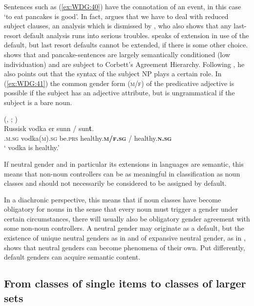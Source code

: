 \documentclass[output=collectionpaper]{langsci/langscibook}
\begin{document}
Sentences such as (\ref{ex:WDG:40}) have the connotation of an event, in this case `to eat pancakes is good'. In fact, \cite{Faarlund1977} argues that we have to deal with reduced subject clauses, an analysis which is dismissed by \cite{Enger2004}, who also shows that any last-resort default analysis runs into serious troubles. \cite[150]{Corbett2006} speaks of extension in use of the default, but last resort defaults cannot be extended, if there is some other choice. \cite{Enger2004} shows that  and  pancake-sentences are largely semantically conditioned (low individuation) and are subject to Corbett's Agreement Hierarchy. Following \cite{Widmark1966}, he also points out that the syntax of the subject NP plays a certain role. In (\ref{ex:WDG:41}) the common gender form (\textsc{m/f}) of the predicative adjective is possible if the subject has an adjective attribute, but is ungrammatical if the subject is a bare noun.

\ea\label{ex:WDG:41}
 (, ; \citealt[24]{Enger2004})\\
\gll	Russisk	vodka	er	sunn	/	sun\textbf{t}.\\
	.\textsc{m.sg}	vodka(\textsc{m).sg}	be.\textsc{prs}	healthy.\textbf{\textsc{m/f.sg}}	/	healthy.\textbf{\textsc{n.sg}}\\
\glt	` vodka is healthy.'\\
\z

If neutral gender and in particular its extensions in  languages are semantic, this means that non-noun controllers can be as meaningful in classification as noun classes and should not necessarily be considered to be assigned by default.

In a diachronic perspective, this means that if noun classes have become obligatory for nouns in the sense that every noun must trigger a gender under certain circumstances, there will usually also be obligatory gender agreement with some non-noun controllers. A neutral gender may originate as a default, but the existence of unique neutral genders as in  and of expansive neutral gender, as in , shows that neutral genders can become phenomena of their own. Put differently, default genders can acquire semantic content.

  \subsection{From classes of single items to classes of larger sets}
\label{sec:WDG:6.6}
\end{document}
